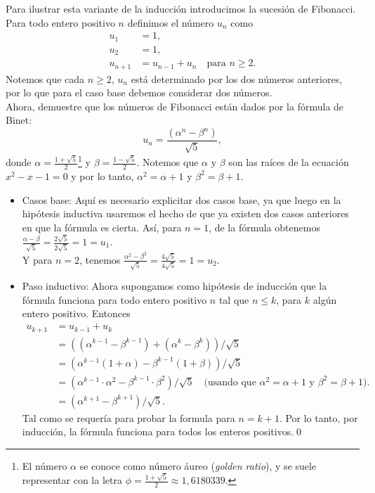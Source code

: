 \documentclass[12pt]{book}
\begin{document}
\begin{exampleenv}
    Para ilustrar esta variante de la inducción introducimos la sucesión de Fibonacci. Para todo entero positivo $n$ definimos el número $u_n$ como
    \begin{align*}
        u_1&=1,\\
        u_2&=1,\\
        u_{n+1}&=u_{n-1}+u_n \quad\text{para }n\ge2.
    \end{align*}
    Notemos que cada $n\ge 2$, $u_n$ está determinado por los dos números anteriores, por lo que para el caso base debemos considerar dos números.\\

    Ahora, demuestre que los números de Fibonacci están dados por la fórmula de Binet:
    \[
    u_n=\frac{(\alpha^n-\beta^n)}{\sqrt{5}},
    \]
    donde $\alpha=\frac{1+\sqrt{5}}{2}$\footnote{El número $\alpha$ se conoce como número áureo (\textit{golden ratio}), y se suele representar con la letra $\phi=\frac{1+\sqrt{5}}{2}\approx1,6180339$.} y $\beta=\frac{1-\sqrt{5}}{2}$. Notemos que $\alpha$ y $\beta$ son las raíces de la ecuación $x^2-x-1=0$ y por lo tanto, $\alpha^2=\alpha+1$ y $\beta^2=\beta +1$.
    \begin{itemize}
        \item Casos base: Aquí es necesario explicitar dos casos base, ya que luego en la hipótesis inductiva usaremos el hecho de que ya existen dos casos anteriores en que la fórmula es cierta. Así, para $n=1$, de la fórmula obtenemos $\frac{\alpha-\beta}{\sqrt{5}}=\frac{2\sqrt{5}}{2\sqrt{5}}=1=u_1$.\\ Y para $n=2$, tenemos $\frac{\alpha^2-\beta^2}{\sqrt{5}}=\frac{4\sqrt{5}}{4\sqrt{5}}=1=u_2.$
        \item Paso inductivo: Ahora supongamos como hipótesis de inducción que la fórmula funciona para todo entero positivo $n$ tal que $n\leq k$, para $k$ algún entero positivo. Entonces
        \begin{align*}
            u_{k+1}&=u_{k-1}+u_k\\
            &=((\alpha^{k-1}-\beta^{k-1})+(\alpha^k-\beta^k))/\sqrt{5}\\
            &=(\alpha^{k-1}(1+\alpha)-\beta^{k-1}(1+\beta))/\sqrt{5}\\
            &=(\alpha^{k-1}\cdot\alpha^2-\beta^{k-1}\cdot\beta^2)/\sqrt{5}\quad\text{(usando que $\alpha^2=\alpha+1$ y $\beta^2=\beta+1$)}.\\
            &=(\alpha^{k+1}-\beta^{k+1})/\sqrt{5}.
        \end{align*}
        Tal como se requería para probar la formula para $n=k+1$. Por lo tanto, por inducción, la fórmula funciona para todos los enteros positivos.\qed
    \end{itemize}
\end{exampleenv}
\end{document}
